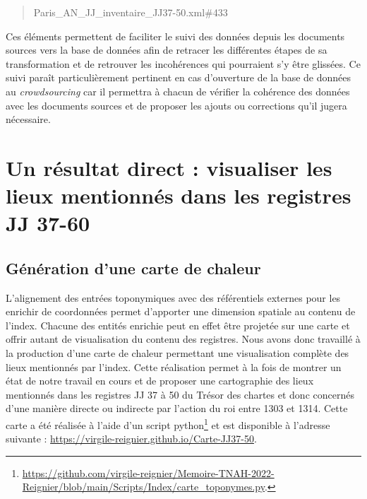 \documentclass[a4paper,12pt,twoside]{book}
\begin{document}
	\begin{quotation}
		Paris\_AN\_JJ\_inventaire\_JJ37-50.xml\#433
	\end{quotation}
	
	\noindent Ces éléments permettent de faciliter le suivi des données depuis les documents sources vers la base de données afin de retracer les différentes étapes de sa transformation et de retrouver les incohérences qui pourraient s'y être glissées. Ce suivi paraît particulièrement pertinent en cas d'ouverture de la base de données au \textit{crowdsourcing} car il permettra à chacun de vérifier la cohérence des données avec les documents sources et de proposer les ajouts ou corrections qu'il jugera nécessaire.
	
	\section{Un résultat direct : visualiser les lieux mentionnés dans les registres JJ 37-60}
	
	\subsection{Génération d'une carte de chaleur}
	
	L'alignement des entrées toponymiques avec des référentiels externes pour les enrichir de coordonnées permet d'apporter une dimension spatiale au contenu de l'index. Chacune des entités enrichie peut en effet être projetée sur une carte et offrir autant de visualisation du contenu des registres. Nous avons donc travaillé à la production d'une carte de chaleur permettant une visualisation complète des lieux mentionnés par l'index. Cette réalisation permet à la fois de montrer un état de notre travail en cours et de proposer une cartographie des lieux mentionnés dans les registres JJ 37 à 50 du Trésor des chartes et donc concernés d'une manière directe ou indirecte par l'action du roi entre 1303 et 1314. Cette carte a été réalisée à l'aide d'un script python\footnote{\url{https://github.com/virgile-reignier/Memoire-TNAH-2022-Reignier/blob/main/Scripts/Index/carte_toponymes.py}.} et est disponible à l'adresse suivante : \url{https://virgile-reignier.github.io/Carte-JJ37-50}.
	
\end{document}
